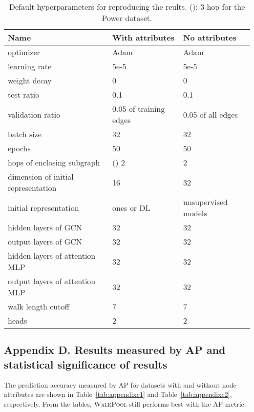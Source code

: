 \documentclass[11pt]{article}
\newcommand{\walkpool}{\textsc{WalkPool}\xspace}
\newcommand{\ra}[1]{\renewcommand{\arraystretch}{#1}}
\begin{document}
\begin{table}[h]
\centering
\ra{1}
\begin{tabular}{@{}lll@{}}
\toprule
      Name                   &  With attributes & No attributes\\ \midrule
      optimizer              &  Adam &  Adam\\
      learning rate          &  5e-5 &  5e-5\\
      weight decay           &  0 &  0\\
      test ratio             &  0.1 &  0.1\\
      validation ratio       &  0.05 of training edges &  0.05 of all edges\\
      batch size             &  32 &  32\\
      epochs                  &  50 &  50\\
      hops of enclosing subgraph        &  () 2 &  2\\
      dimension of initial representation     &  16 &  32\\
      initial representation       &  ones or DL &  unsupervised models\\
      hidden layers of GCN   &  32 &  32\\
      output layers of GCN   &  32 &  32\\
      hidden layers of attention MLP   &  32 &  32\\
      output layers of attention MLP   &  32 &  32\\
      walk length cutoff   &  7 &  7\\
      heads                  &  2 &  2\\
  
\bottomrule

\end{tabular}
\caption{Default hyperparameters for reproducing the reults. (): 3-hop for the Power dataset.}
\label{tab: appendixb}
\end{table}



\subsection*{Appendix D. Results measured by AP and statistical significance of results}
The prediction accuracy measured by AP for datasets with and without node attributes are shown in Table~\ref{tab:appendixc1} and Table~\ref{tab:appendixc2}, respectively. From the tables, \walkpool still performs best with the AP metric.
\end{document}
